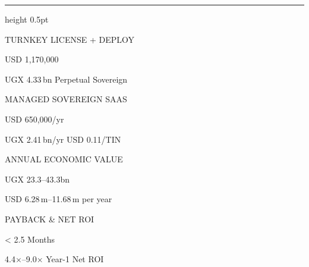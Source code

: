 \documentclass[10pt,a4paper]{article}
\begin{document}
\begin{titlepage}
\vfill
{\color{rulec}\hrule height 0.5pt}\vspace{5mm}
\noindent\begin{minipage}[t]{39mm}\RaggedRight
{\fontsize{6.2}{8}\selectfont\textcolor{inkiii}{TURNKEY LICENSE + DEPLOY}\par}\vspace{2.4mm}
{\datafont\fontsize{13.4}{14}\selectfont\textcolor{oxblood}{USD 1,170,000}\par}\vspace{2mm}
{\fontsize{7.6}{9.6}\selectfont\color{inkii}UGX 4.33\,bn \textperiodcentered{} Perpetual Sovereign\par}
\end{minipage}\hfill
\begin{minipage}[t]{39mm}\RaggedRight
{\fontsize{6.2}{8}\selectfont\textcolor{inkiii}{MANAGED SOVEREIGN SAAS}\par}\vspace{2.4mm}
{\datafont\fontsize{13.4}{14}\selectfont\textcolor{oxblood}{USD 650,000/yr}\par}\vspace{2mm}
{\fontsize{7.6}{9.6}\selectfont\color{inkii}UGX 2.41\,bn/yr \textperiodcentered{} USD 0.11/TIN\par}
\end{minipage}\hfill
\begin{minipage}[t]{43mm}\RaggedRight
{\fontsize{6.2}{8}\selectfont\textcolor{inkiii}{ANNUAL ECONOMIC VALUE}\par}\vspace{2.4mm}
{\datafont\fontsize{13.4}{14}\selectfont\textcolor{ink}{UGX 23.3--43.3bn}\par}\vspace{2mm}
{\fontsize{7.6}{9.6}\selectfont\color{inkii}USD 6.28\,m--11.68\,m per year\par}
\end{minipage}\hfill
\begin{minipage}[t]{35mm}\RaggedRight
{\fontsize{6.2}{8}\selectfont\textcolor{inkiii}{PAYBACK \& NET ROI}\par}\vspace{2.4mm}
{\datafont\fontsize{13.4}{14}\selectfont\textcolor{ink}{< 2.5 Months}\par}\vspace{2mm}
{\fontsize{7.6}{9.6}\selectfont\color{inkii}4.4\ensuremath{\times}--9.0\ensuremath{\times} Year-1 Net ROI\par}
\end{minipage}


\end{titlepage}
\end{document}
